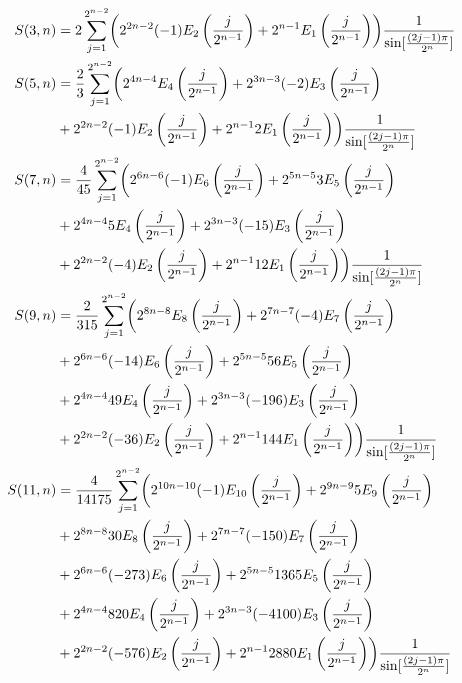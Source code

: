 \documentclass[fleqn,a4paper,9pt]{article}
\begin{document}
\begin{flushleft}
\begin{align}\notag
S(3,n)&=2\sum_{j=1}^{2^{n-2}}\biggl(2^{2n-2}(-1) E_2\left(\frac{j}{2^{n-1}}\right) +2^{n-1} E_1\left(\frac{j}{2^{n-1}}\right)\biggr)\frac{1}{\sin[\frac{(2j-1)\pi}{2^n}]}\\\notag
S(5,n)&=\frac{2}{3}\sum_{j=1}^{2^{n-2}} \biggl(2^{4n-4}E_4\left(\frac{j}{2^{n-1}}\right)+2^{3n-3}(-2)E_3\left(\frac{j}{2^{n-1}}\right)\\\notag
&+2^{2n-2} (-1)E_2\left(\frac{j}{2^{n-1}}\right)+2^{n-1} 2E_1\left(\frac{j}{2^{n-1}}\right) \biggr)\frac{1}{\sin[\frac{(2j-1)\pi}{2^n}]}\\\notag
S(7,n)&=\frac{4}{45}\sum_{j=1}^{2^{n-2}}\biggl(2^{6n-6}  (-1)E_6\left(\frac{j}{2^{n-1}}\right)+2^{5n-5}3E_5\left(\frac{j}{2^{n-1}}\right)\\\notag
&+2^{4n-4}5E_4\left(\frac{j}{2^{n-1}}\right)+2^{3n-3}(-15)E_3\left(\frac{j}{2^{n-1}}\right)\\\notag
&+2^{2n-2}(- 4)E_2\left(\frac{j}{2^{n-1}}\right)+2^{n-1} 12E_1\left(\frac{j}{2^{n-1}}\right)  \biggr)\frac{1}{\sin[\frac{(2j-1)\pi}{2^n}]}\\\notag
S(9,n)&=\frac{2}{315}\sum_{j=1}^{2^{n-2}}\biggl(2^{8n-8}  E_8\left(\frac{j}{2^{n-1}}\right)+2^{7n-7}(-4)E_7\left(\frac{j}{2^{n-1}}\right)\\\notag
&+2^{6n-6}  (-14)E_6\left(\frac{j}{2^{n-1}}\right)+2^{5n-5}56E_5\left(\frac{j}{2^{n-1}}\right)\\\notag
&+2^{4n-4}49E_4\left(\frac{j}{2^{n-1}}\right)+2^{3n-3}(-196)E_3\left(\frac{j}{2^{n-1}}\right)\\\notag
&+2^{2n-2}(- 36)E_2\left(\frac{j}{2^{n-1}}\right)+2^{n-1} 144E_1\left(\frac{j}{2^{n-1}}\right)  \biggr)\frac{1}{\sin[\frac{(2j-1)\pi}{2^n}]}\\\notag
S(11,n)&=\frac{4}{14175}\sum_{j=1}^{2^{n-2}}\biggl(2^{10n-10} (-1) E_{10}\left(\frac{j}{2^{n-1}}\right)+2^{9n-9}5E_9\left(\frac{j}{2^{n-1}}\right)\\\notag
&+2^{8n-8}30  E_8\left(\frac{j}{2^{n-1}}\right)+2^{7n-7}(-150)E_7\left(\frac{j}{2^{n-1}}\right)\\\notag
&+2^{6n-6}  (-273)E_6\left(\frac{j}{2^{n-1}}\right)+2^{5n-5}1365 E_5\left(\frac{j}{2^{n-1}}\right)\\\notag
&+2^{4n-4}820 E_4\left(\frac{j}{2^{n-1}}\right)+2^{3n-3}(-4100)E_3\left(\frac{j}{2^{n-1}}\right)\\\notag
&+2^{2n-2}(- 576)E_2\left(\frac{j}{2^{n-1}}\right)+2^{n-1} 2880 E_1\left(\frac{j}{2^{n-1}}\right)  \biggr)\frac{1}{\sin[\frac{(2j-1)\pi}{2^n}]}\\\notag

\end{align}
\end{flushleft}
\end{document}
